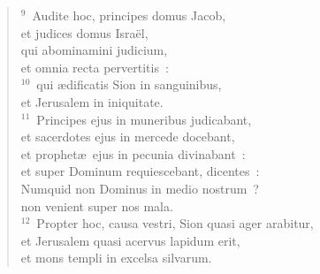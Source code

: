 \begin{flushleft}
\begin{verse}
${}^{9}$~Audite hoc, principes domus Jacob,\\ et judices domus Isra\"el,\\ qui abominamini judicium,\\ et omnia recta pervertitis~:\\
${}^{10}$~qui \ae dificatis Sion in sanguinibus,\\ et Jerusalem in iniquitate.\\
${}^{11}$~Principes ejus in muneribus judicabant,\\ et sacerdotes ejus in mercede docebant,\\ et prophet\ae\ ejus in pecunia divinabant~:\\ et super Dominum requiescebant, dicentes~:\\ Numquid non Dominus in medio nostrum~?\\ non venient super nos mala.\\
${}^{12}$~Propter hoc, causa vestri, Sion quasi ager arabitur,\\ et Jerusalem quasi acervus lapidum erit,\\ et mons templi in excelsa silvarum.\end{verse}\end{flushleft}


